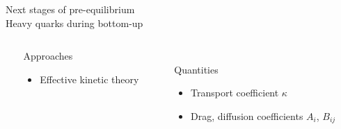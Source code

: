 \documentclass[aspectratio=169,11pt,usenames,dvipsnames]{beamer}
\begin{document}
\begin{frame}{}
    \begin{center}
        \vspace{1cm}
        {\large\color{normal}Next stages of pre-equilibrium}\\[0.3cm]
        {\huge\color{destacado}Heavy quarks during bottom-up}\\[0.3cm]
        {\large\color{normal}
        \begin{center}
            \begin{columns}
                \begin{column}{0.066\textwidth}\end{column}
                \begin{column}{0.35\textwidth}
                    \centering
                    {\Large\color{ming} Approaches}
                    \begin{itemize}
                        \item Effective kinetic theory
                    \end{itemize}
                \end{column}
                \begin{column}{0.066\textwidth}\end{column}
                \begin{column}{0.45\textwidth}
                    \centering
                    \\[10pt]
                    {\Large\color{pinky} Quantities}
                    \begin{itemize}
                        \item Transport coefficient $\kappa$
                        \item Drag, diffusion coefficients $A_i$, $B_{ij}$
                    \end{itemize}
                \end{column}
                \begin{column}{0.066\textwidth}\end{column}
            \end{columns}
        \end{center}
        }
    \end{center}
\end{frame}
\end{document}
